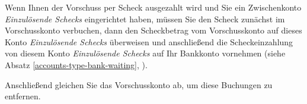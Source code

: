 Wenn Ihnen der Vorschuss per Scheck ausgezahlt wird und Sie ein Zwischenkonto \emph{Einzulösende Schecks} eingerichtet haben, müssen Sie den Scheck zunächst im Vorschusskonto verbuchen, dann den Scheckbetrag vom Vorschusskonto auf dieses Konto \emph{Einzulösende Schecks} überweisen und anschließend die Scheckeinzahlung von diesem Konto \emph{Einzulösende Schecks} auf Ihr Bankkonto vornehmen (siehe Absatz \vref{accounts-type-bank-waiting}, ).

Anschließend gleichen Sie das Vorschusskonto ab, um diese Buchungen zu entfernen.

